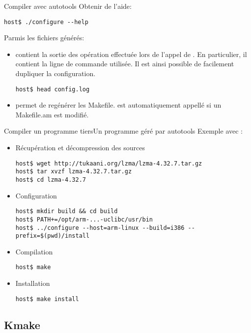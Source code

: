 \begin{frame}[fragile=singleslide]{Compiler avec autotools}
  Obtenir de l'aide:
\begin{lstlisting}
host$ ./configure --help
\end{lstlisting} %

  Parmis les fichiers générés:
  \begin{itemize}
  \item {}  contient la sortie  des opération effectuée
    lors de l'appel de .  En particulier, il contient
    la ligne de commande utilisée. Il est ainsi possible de facilement
    dupliquer la configuration.
\begin{lstlisting}
host$ head config.log
\end{lstlisting} %
  \item     {}     permet     de    regénérer     les
    Makefile.   est  automatiquement appellé  si un
    Makefile.am est modifié.
  \end{itemize}
\end{frame}

\begin{frame}[fragile=singleslide]{Compiler un  programme tiers}{Un programme géré par autotools}
  Exemple avec :
  \begin{itemize}
  \item Récupération et décompression des sources
\begin{lstlisting}
host$ wget http://tukaani.org/lzma/lzma-4.32.7.tar.gz  
host$ tar xvzf lzma-4.32.7.tar.gz
host$ cd lzma-4.32.7
\end{lstlisting} %
  \item Configuration
\begin{lstlisting}
host$ mkdir build && cd build
host$ PATH+=/opt/arm-...-uclibc/usr/bin
host$ ../configure --host=arm-linux --build=i386 --prefix=$(pwd)/install
\end{lstlisting} %
  \item Compilation
\begin{lstlisting}
host$ make
\end{lstlisting} %
  \item Installation
\begin{lstlisting}
host$ make install
\end{lstlisting} %
  \end{itemize}
\end{frame}

\subsection{Kmake}


